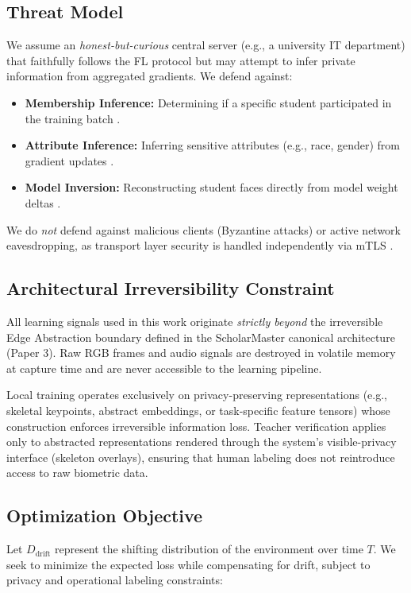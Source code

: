 \documentclass[conference]{IEEEtran}
\begin{document}
\subsection{Threat Model}

We assume an \textit{honest-but-curious} central server (e.g., a university IT department) that faithfully follows the FL protocol but may attempt to infer private information from aggregated gradients. We defend against:
\begin{itemize}
    \item \textbf{Membership Inference:} Determining if a specific student participated in the training batch \cite{b16}.
    \item \textbf{Attribute Inference:} Inferring sensitive attributes (e.g., race, gender) from gradient updates \cite{b17}.
    \item \textbf{Model Inversion:} Reconstructing student faces directly from model weight deltas \cite{b18}.
\end{itemize}
We do \textit{not} defend against malicious clients (Byzantine attacks) or active network eavesdropping, as transport layer security is handled independently via mTLS \cite{b1}.

\subsection{Architectural Irreversibility Constraint}

All learning signals used in this work originate \textit{strictly beyond} the irreversible Edge Abstraction boundary defined in the ScholarMaster canonical architecture (Paper 3). Raw RGB frames and audio signals are destroyed in volatile memory at capture time and are never accessible to the learning pipeline.

Local training operates exclusively on privacy-preserving representations (e.g., skeletal keypoints, abstract embeddings, or task-specific feature tensors) whose construction enforces irreversible information loss. Teacher verification applies only to abstracted representations rendered through the system's visible-privacy interface (skeleton overlays), ensuring that human labeling does not reintroduce access to raw biometric data. 

\subsection{Optimization Objective}

Let $D_{\text{drift}}$ represent the shifting distribution of the environment over time $T$. We seek to minimize the expected loss while compensating for drift, subject to privacy and operational labeling constraints:
\end{document}

